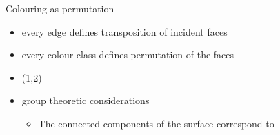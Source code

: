 \begin{frame}{Colouring as permutation}
{        \begin{itemize}
            \item<6->[$\leadsto$] every edge defines transposition of incident faces
            \item<9->[$\leadsto$] every colour class defines permutation of the faces
            \item<7-> \textcolor{\colB}{(1,2)}
            \item<12->[$\leadsto$] group theoretic considerations
                \begin{itemize}
                    \item<13-> The connected components of the surface correspond to 
                \end{itemize}
        \end{itemize}
    }
\end{frame}
         

